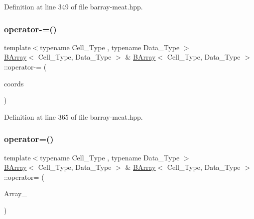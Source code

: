 Definition at line 349 of file barray-\/meat.\+hpp.

\mbox{\label{class_b_array_ae5dc994ddca6944654e05bf813a8b402}} 
\subsubsection{\texorpdfstring{operator-\/=()}{operator-=()}}
{\footnotesize\ttfamily template$<$typename Cell\+\_\+\+Type , typename Data\+\_\+\+Type $>$ \\
\hyperlink{class_b_array}{B\+Array}$<$ Cell\+\_\+\+Type, Data\+\_\+\+Type $>$ \& \hyperlink{class_b_array}{B\+Array}$<$ Cell\+\_\+\+Type, Data\+\_\+\+Type $>$\+::operator-\/= (\begin{DoxyParamCaption}\item[{const std\+::pair$<$ \hyperlink{typedefs_8hpp_a91ad9478d81a7aaf2593e8d9c3d06a14}{uint}, \hyperlink{typedefs_8hpp_a91ad9478d81a7aaf2593e8d9c3d06a14}{uint} $>$ \&}]{coords }\end{DoxyParamCaption})\hspace{0.3cm}{\ttfamily [inline]}}



Definition at line 365 of file barray-\/meat.\+hpp.

\mbox{\label{class_b_array_aa6dba52877c92fa8eafc35faa5f7f304}} 
\subsubsection{\texorpdfstring{operator=()}{operator=()}}
{\footnotesize\ttfamily template$<$typename Cell\+\_\+\+Type , typename Data\+\_\+\+Type $>$ \\
\hyperlink{class_b_array}{B\+Array}$<$ Cell\+\_\+\+Type, Data\+\_\+\+Type $>$ \& \hyperlink{class_b_array}{B\+Array}$<$ Cell\+\_\+\+Type, Data\+\_\+\+Type $>$\+::operator= (\begin{DoxyParamCaption}\item[{const \hyperlink{class_b_array}{B\+Array}$<$ Cell\+\_\+\+Type, Data\+\_\+\+Type $>$ \&}]{Array\+\_\+ }\end{DoxyParamCaption})\hspace{0.3cm}{\ttfamily [inline]}}



